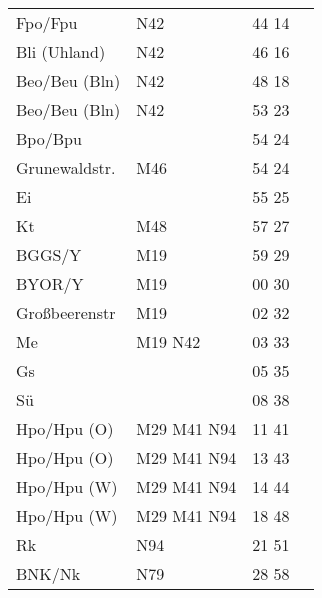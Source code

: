 \begin{tabular}{!{\color{schiefergrau}\vrule width 3pt}*{4}{l!{\color{schiefergrau}\vrule width 3pt}}}
Fpo/Fpu      & \nudrei{} \nbus{} N42                       & 44 14 &             \\
Bli (Uhland) & \nbus{} N42                                 & 46 16 &             \\
Beo/Beu (Bln)& \nuneun{} \nbus{} N42                       & 48 18 &             \\
\hline
Beo/Beu (Bln)& \nuneun{} \nbus{} N42                       & 53 23 &             \\
Bpo/Bpu      &                                             & 54 24 &             \\
Grunewaldstr.& \mbus{} M46                                 & 54 24 &             \\
Ei           &                                             & 55 25 &             \\
Kt           & \mbus{} M48                                 & 57 27 &             \\
BGGS/Y       & \mbus{} M19                                 & 59 29 &             \\
BYOR/Y       & \mbus{} M19                                 & 00 30 &             \\
Großbeerenstr& \mbus{} M19                                 & 02 32 &             \\
Me           & \nusechs{} \mbus{} M19 \nbus{} N42          & 03 33 &             \\
Gs           &                                             & 05 35 &             \\
Sü           &                                             & 08 38 &             \\
Hpo/Hpu (O)  & \nuacht{} \mbus{} M29 M41 \nbus{} N94       & 11 41 &             \\
\hline
Hpo/Hpu (O)  & \nuacht{} \mbus{} M29 M41 \nbus{} N94       & 13 43 &             \\
Hpo/Hpu (W)  & \nuacht{} \mbus{} M29 M41 \nbus{} N94       & 14 44 &             \\
\hline
Hpo/Hpu (W)  & \nuacht{} \mbus{} M29 M41 \nbus{} N94       & 18 48 &             \\
Rk           & \nbus{} N94                                 & 21 51 &             \\
BNK/Nk       & \nbus{} N79                                 & 28 58 &             \\

\end{tabular}
